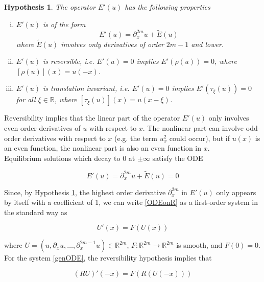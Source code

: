 \documentclass[12pt]{article}
\def\R{{\mathbb R}}
\newtheorem{hypothesis}{Hypothesis}
\begin{document}
\begin{hypothesis}\label{Eprimehyp}
The operator $E'(u)$ has the following properties
\begin{enumerate}[(i)]
\item $E'(u)$ is of the form
\begin{equation}\label{Eprimeuform}
E'(u) = \partial_x^{2m}u + \tilde{E}(u)
\end{equation}
where $\tilde{E}(u)$ involves only derivatives of order $2m-1$ and lower.
\item $E'(u)$ is reversible, i.e. $E'(u) = 0$ implies $E'(\rho(u)) = 0$,
where $[\rho(u)](x) = u(-x)$.
\item $E'(u)$ is translation invariant, i.e. $E'(u) = 0$ implies $E'(\tau_\xi(u)) = 0$ for all $\xi \in \R$, where $[\tau_\xi(u)](x) = u(x - \xi)$.
\end{enumerate}
\end{hypothesis}

Reversibility implies that the linear part of the operator $E'(u)$ only involves even-order derivatives of $u$ with respect to $x$. The nonlinear part can involve odd-order derivatives with respect to $x$ (e.g. the term $u_x^2$ could occur), but if $u(x)$ is an even function, the nonlinear part is also an even function in $x$.\\

Equilibrium solutions which decay to 0 at $\pm \infty$ satisfy the ODE 

\begin{equation}\label{ODEonR}
E'(u) = \partial_x^{2m}u + \tilde{E}(u) = 0
\end{equation}

Since, by Hypothesis \ref{Eprimehyp}, the highest order derivative $\partial_x^{2m}$ in $E'(u)$ only appears by itself with a coefficient of 1, we can write \eqref{ODEonR} as a first-order system in the standard way as

\begin{equation}\label{genODE}
U'(x) = F(U(x))
\end{equation}

where $U = (u, \partial_x u, \dots, \partial_x^{2m-1} u) \in \R^{2m}$, $F: \R^{2m} \rightarrow \R^{2m}$ is smooth, and $F(0) = 0$. For the system \eqref{genODE}, the reversibility hypothesis implies that

\begin{equation}\label{genODErev}
(RU)'(-x) = F(R(U(-x)))
\end{equation}
\end{document}
